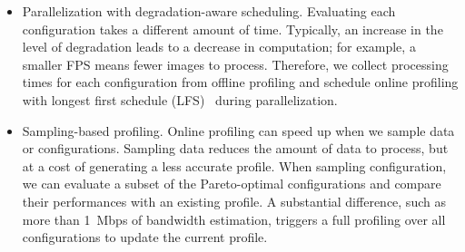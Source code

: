 \begin{itemize}[leftmargin=*, topsep=3pt]

\item Parallelization with degradation-aware scheduling. Evaluating each
  configuration takes a different amount of time. Typically, an increase in the
  level of degradation leads to a decrease in computation; for example, a
  smaller FPS means fewer images to process. Therefore, we collect processing
  times for each configuration from offline profiling and schedule online
  profiling with longest first schedule (LFS)~\cite{karger2010scheduling} during
  parallelization.

\item Sampling-based profiling. Online profiling can speed up when we sample
  data or configurations. Sampling data reduces the amount of data to process,
  but at a cost of generating a less accurate profile. When sampling
  configuration, we can evaluate a subset of the Pareto-optimal configurations
  and compare their performances with an existing profile. A substantial
  difference, such as more than \SI{1}{Mbps} of bandwidth estimation, triggers a
  full profiling over all configurations to update the current profile.

\end{itemize}


